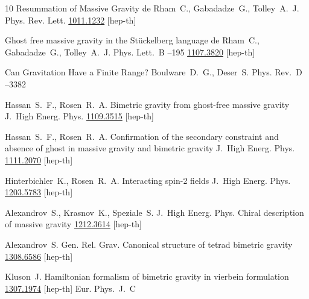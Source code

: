 \begin{thebibliography}{10}
\paper Resummation of Massive Gravity
\by  de Rham~C.,  Gabadadze~G., Tolley~A.~J.
\jour Phys. Rev. Lett.
\arxiv \href{http://arxiv.org/abs/1011.1232}{1011.1232} [hep-th]


\paper Ghost free massive gravity in the St\"uckelberg language
\by  de Rham~C.,  Gabadadze~G., Tolley~A.~J.
\jour Phys. Lett.~B 
--195
\arxiv \href{http://arxiv.org/abs/1107.3820}{1107.3820} [hep-th]

\paper Can Gravitation Have a Finite Range?
\by Boulware~D.~G.,  Deser~S.
\jour Phys. Rev.~D 
--3382

\by	 	Hassan~S.~F., Rosen~R.~A.
\paper  Bimetric gravity from ghost-free massive gravity
\jour J.~High Energ. Phys. 
\arxiv \href{http://arxiv.org/abs/1109.3515}{1109.3515} [hep-th]


\by	 	Hassan~S.~F., Rosen~R.~A.
\paper Confirmation of the secondary constraint and absence of ghost in massive gravity and bimetric gravity
\jour J.~High Energ. Phys. 
\arxiv \href{http://arxiv.org/abs/1111.2070}{1111.2070} [hep-th]


\by Hinterbichler~K., Rosen~R.~A.
\paper  Interacting spin-2 fields 
\jour J.~High Energ. Phys. 
\arxiv \href{http://arxiv.org/abs/1203.5783}{1203.5783} [hep-th] 


\by Alexandrov~S., Krasnov~K., Speziale~S.
\jour J.~High Energ. Phys. 
\paper Chiral description of massive gravity 
\arxiv \href{http://arxiv.org/abs/1212.3614}{1212.3614} [hep-th] 



\by Alexandrov~S.
\jour Gen. Rel. Grav.
\paper  Canonical structure of tetrad bimetric gravity 
\arxiv \href{http://arxiv.org/abs/1308.6586}{1308.6586} [hep-th] 


\by Kluson~J. 
\paper Hamiltonian formalism of bimetric gravity in vierbein formulation
\arxiv \href{http://arxiv.org/abs/1307.1974}{1307.1974} [hep-th] 
\jour Eur. Phys.~J.~C 



\end{thebibliography}
